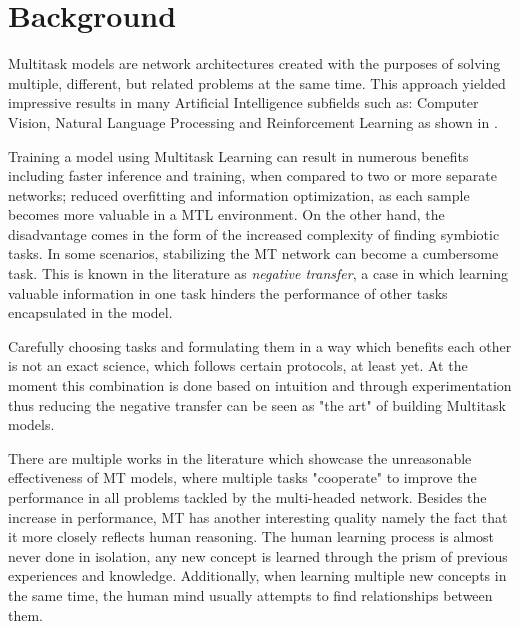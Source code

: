 \documentclass[conference]{IEEEtran}
\begin{document}
\section{Background}
\label{chapter:RelatedWork}

Multitask models are network architectures created with the purposes of solving multiple, different, but related problems at the same time. This approach yielded impressive results in many Artificial Intelligence subfields such as: Computer Vision, Natural Language Processing and Reinforcement Learning as shown in \cite{crawshaw2020multi}.

Training a model using Multitask Learning can result in numerous benefits including faster inference and training, when compared to two or more separate networks; reduced overfitting and information optimization, as each sample becomes more valuable in a MTL environment. On the other hand, the disadvantage comes in the form of the increased complexity of finding symbiotic tasks. In some scenarios, stabilizing the MT network can become a cumbersome task. This is known in the literature as \textit{negative transfer}, a case in which learning valuable information in one task hinders the performance of other tasks encapsulated in the model.

Carefully choosing tasks and formulating them in a way which benefits each other is not an exact science, which follows certain protocols, at least yet. At the moment this combination is done based on intuition and through experimentation thus reducing the negative transfer can be seen as "the art" of building Multitask models. 

There are multiple works in the literature which showcase the unreasonable effectiveness of MT models, where multiple tasks "cooperate" to improve the performance in all problems tackled by the multi-headed network. Besides the increase in performance, MT has another interesting quality namely the fact that it more closely reflects human reasoning. The human learning process is almost never done in isolation, any new concept is learned through the prism of previous experiences and knowledge. Additionally, when learning multiple new concepts in the same time, the human mind usually attempts to find relationships between them. 
\end{document}

